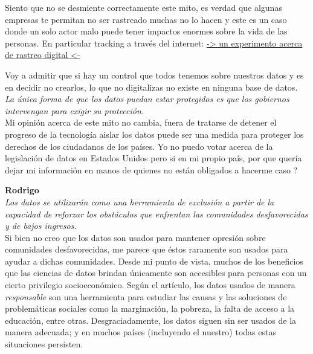 \documentclass[12pt,a4paper]{article}
\begin{document}
\begin{enumerate}
\begin{enumerate}
				Siento que no se desmiente correctamente este
				mito, es verdad que algunas empresas te permitan
				no ser rastreado muchas no lo hacen y este es
				un caso donde un solo actor malo
				puede tener impactos enormes sobre la vida de
				las personas. En particular tracking
				a través del internet: \href{https://coveryourtracks.eff.org/}{-> un experimento acerca de rastreo digital <-}

				Voy a admitir que si hay un control que todos
				tenemos sobre nuestros datos y es en decidir no
				crearlos, lo que no digitalizas no existe
				en ninguna base de datos.\\

				\textit{La única forma de que los datos puedan estar protegidos es que
				los gobiernos intervengan para exigir su protección.}\\

				Mi opinión acerca de este mito no cambia,
				fuera de tratarse de detener el progreso de la tecnología
				aislar los datos puede ser una medida para proteger los
				derechos de los ciudadanos de los países.
				Yo no puedo votar acerca de la legislación de datos
				en Estados Unidos pero si en mi propio país, por que
				quería dejar mi información en manos de quienes no
				están obligados a hacerme caso ?
				
				\textbf{Rodrigo}\\
				\textit {Los datos se utilizarán como una herramienta de exclusión a 
				partir de la capacidad de reforzar los obstáculos que enfrentan 
				las comunidades desfavorecidas y de bajos ingresos.} \\
				
				Si bien no creo que los datos son usados para mantener opresión sobre 
				comunidades desfavorecidas, me parece que éstos raramente son usados para
				ayudar a dichas comunidades. Desde mi punto de vista, muchos de los beneficios 
				que las ciencias de datos brindan únicamente son accesibles para personas con un 
				cierto privilegio socioeconómico. Según el artículo, los datos usados de manera 
				\textit{responsable} son una herramienta para estudiar las causas y las soluciones 
				de problemáticas sociales como la marginación, la pobreza, la falta de acceso a la educación,
				entre otras. Desgraciadamente, los datos siguen sin ser usados de la manera adecuada; 
				y en muchos países (incluyendo el nuestro) todas estas situaciones persisten. \\
				

\end{enumerate}
\end{enumerate}
\end{document}
